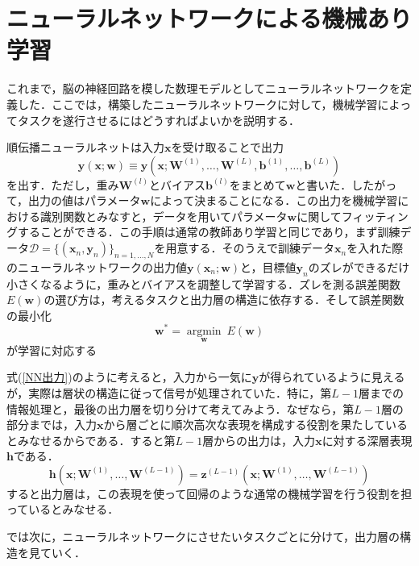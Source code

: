 \documentclass[a4paper,11pt]{jsreport}
\begin{document}
\section{ニューラルネットワークによる機械あり学習}
これまで，脳の神経回路を模した数理モデルとしてニューラルネットワークを定義した．ここでは，構築したニューラルネットワークに対して，機械学習によってタスクを遂行させるにはどうすればよいかを説明する．\par
順伝播ニューラルネットは入力$\bm{x}$を受け取ることで出力
\begin{equation}
  \bm{y}(\bm{x}; \bm{w})
  \equiv \bm{y}\left( \bm{x}; \bm{W}^{(1)},\dots ,\bm{W}^{(L)},\bm{b}^{(1)},\dots ,\bm{b}^{(L)} \right) \label{NN出力}
\end{equation}
を出す．ただし，重み$\bm{W}^{(l)}$とバイアス$\bm{b}^{(l)}$をまとめて$\bm{w}$と書いた．したがって，出力の値はパラメータ$\bm{w}$によって決まることになる．この出力を機械学習における識別関数とみなすと，データを用いてパラメータ$\bm{w}$に関してフィッティングすることができる．この手順は通常の教師あり学習と同じであり，まず訓練データ$\mathcal{D}=\{ (\bm{x}_n, \bm{y}_n) \}_{n=1,\dots ,N}$を用意する．そのうえで訓練データ$\bm{x}_n$を入れた際のニューラルネットワークの出力値$\bm{y}(\bm{x}_n; \bm{w})$と，目標値$\bm{y}_n$のズレができるだけ小さくなるように，重みとバイアスを調整して学習する．ズレを測る誤差関数$E(\bm{w})$の選び方は，考えるタスクと出力層の構造に依存する．そして誤差関数の最小化
\begin{equation}
  \bm{w}^* = \underset{\bm{w}} {\operatorname{argmin}} \ E(\bm{w})
\end{equation}
が学習に対応する\par
式(\ref{NN出力})のように考えると，入力から一気に$\bm{y}$が得られているように見えるが，実際は層状の構造に従って信号が処理されていた．特に，第$L-1$層までの情報処理と，最後の出力層を切り分けて考えてみよう．なぜなら，第$L-1$層の部分までは，入力$\bm{x}$から層ごとに順次高次な表現を構成する役割を果たしているとみなせるからである．すると第$L-1$層からの出力は，入力$\bm{x}$に対する深層表現$\bm{h}$である．
\begin{equation}
  \bm{h}\left( \bm{x}; \bm{W}^{(1)},\dots ,\bm{W}^{(L-1)} \right)
  = \bm{z}^{(L-1)}\left( \bm{x}; \bm{W}^{(1)},\dots ,\bm{W}^{(L-1)} \right)
\end{equation}
すると出力層は，この表現を使って回帰のような通常の機械学習を行う役割を担っているとみなせる．\par
では次に，ニューラルネットワークにさせたいタスクごとに分けて，出力層の構造を見ていく．
\end{document}
